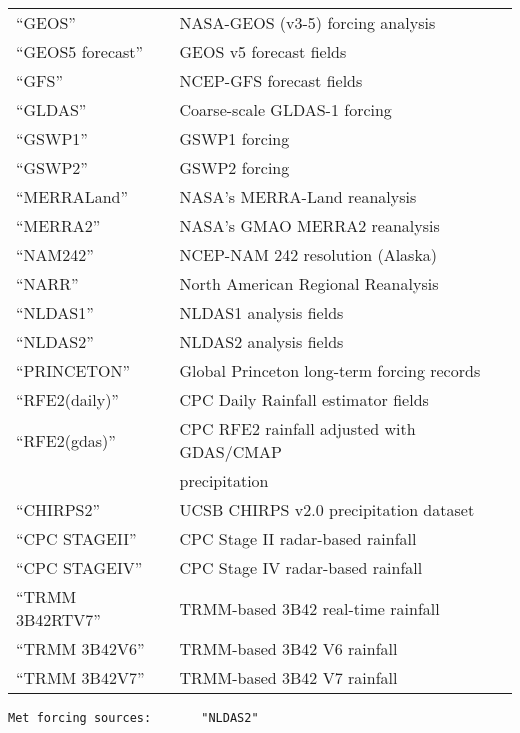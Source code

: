 \begin{tabular}{ll}
 ``GEOS''              & NASA-GEOS (v3-5) forcing analysis          \\
 ``GEOS5 forecast''    & GEOS v5 forecast fields                    \\
 ``GFS''               & NCEP-GFS forecast fields                   \\
 ``GLDAS''             & Coarse-scale GLDAS-1 forcing               \\
 ``GSWP1''             & GSWP1 forcing                              \\
 ``GSWP2''             & GSWP2 forcing                              \\
 ``MERRA\-Land''       & NASA's MERRA-Land reanalysis               \\
 ``MERRA2''            & NASA's GMAO MERRA2 reanalysis              \\
 ``NAM242''            & NCEP-NAM 242 resolution (Alaska)           \\
 ``NARR''              & North American Regional Reanalysis         \\
 ``NLDAS1''            & NLDAS1 analysis fields                     \\
 ``NLDAS2''            & NLDAS2 analysis fields                     \\
 ``PRINCETON''         & Global Princeton long-term forcing records \\
 ``RFE2(daily)''       & CPC Daily Rainfall estimator fields        \\
 ``RFE2(gdas)''        & CPC RFE2 rainfall adjusted with GDAS/CMAP  \\
                       & precipitation                              \\
 ``CHIRPS2''           & UCSB CHIRPS v2.0 precipitation dataset     \\
 ``CPC STAGEII''       & CPC Stage II radar-based rainfall          \\
 ``CPC STAGEIV''       & CPC Stage IV radar-based rainfall          \\
 ``TRMM 3B42RTV7''     & TRMM-based 3B42 real-time rainfall         \\
 ``TRMM 3B42V6''       & TRMM-based 3B42 V6 rainfall                \\
 ``TRMM 3B42V7''       & TRMM-based 3B42 V7 rainfall                \\
 \end{tabular}
 

 \begin{Verbatim}[frame=single]
Met forcing sources:       "NLDAS2"
 \end{Verbatim}

